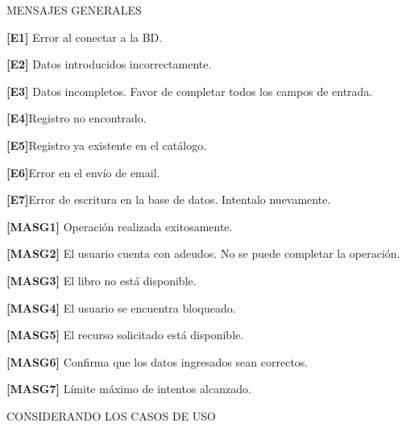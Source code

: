 MENSAJES GENERALES
	\begin{Citemize}
	\item {\bf [E1]} Error al conectar a la BD.
	\item {\bf [E2]} Datos introducidos incorrectamente. 
	\item {\bf [E3]} Datos incompletos. Favor de completar todos los campos de entrada.
	\item {\bf [E4]}Registro no encontrado.
	\item {\bf [E5]}Registro ya existente en el catálogo.
	\item {\bf [E6]}Error en el envío de email.
	\item {\bf [E7]}Error de escritura en la base de datos. Intentalo nuevamente.

	\item {\bf [MASG1]} Operación realizada exitosamente.
	\item {\bf [MASG2]} El usuario cuenta con adeudos. No se puede completar la operación.
	\item {\bf [MASG3]} El libro no está disponible.
	\item {\bf [MASG4]} El usuario se encuentra bloqueado.
	\item {\bf [MASG5]} El recurso solicitado está disponible.
	\item {\bf [MASG6]} Confirma que los datos ingresados sean correctos.
	\item {\bf [MASG7]} Límite máximo de intentos alcanzado.

CONSIDERANDO LOS CASOS DE USO


\end{Citemize}
